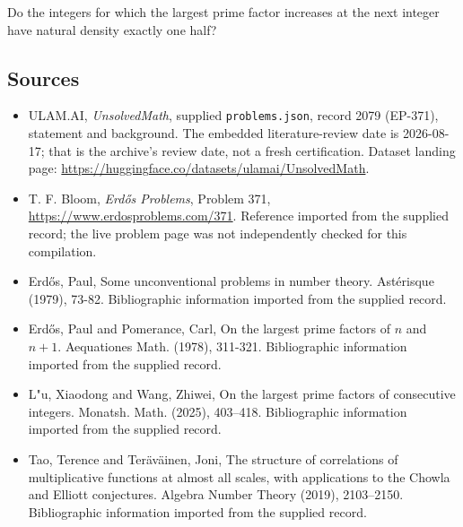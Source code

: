 \documentclass[11pt,a4paper]{article}
\begin{document}
Do the integers for which the largest prime factor increases at the next integer have natural density exactly one half?

\subsection{Sources}

{\small

\begin{itemize}

\item[\hypertarget{source:2079:1}{S1}] ULAM.AI, \emph{UnsolvedMath}, supplied \texttt{problems.json}, record 2079 (EP-371), statement and background. The embedded literature-review date is 2026-08-17; that is the archive’s review date, not a fresh certification. Dataset landing page: \url{https://huggingface.co/datasets/ulamai/UnsolvedMath}.

\item[\hypertarget{source:2079:2}{S2}] T. F. Bloom, \emph{Erdős Problems}, Problem 371, \url{https://www.erdosproblems.com/371}. Reference imported from the supplied record; the live problem page was not independently checked for this compilation.

\item[\hypertarget{source:2079:3}{S3}] Erd\H{o}s, Paul, Some unconventional problems in number theory. Ast\'{e}risque (1979), 73-82. Bibliographic information imported from the supplied record.

\item[\hypertarget{source:2079:4}{S4}] Erd\H{o}s, Paul and Pomerance, Carl, On the largest prime factors of {$n$} and {$n+1$}. Aequationes Math. (1978), 311-321. Bibliographic information imported from the supplied record.

\item[\hypertarget{source:2079:5}{S5}] L"u, Xiaodong and Wang, Zhiwei, On the largest prime factors of consecutive integers. Monatsh. Math. (2025), 403--418. Bibliographic information imported from the supplied record.

\item[\hypertarget{source:2079:6}{S6}] Tao, Terence and Ter\"{a}v\"{a}inen, Joni, The structure of correlations of multiplicative functions at almost all scales, with applications to the {C}howla and {E}lliott conjectures. Algebra Number Theory (2019), 2103--2150. Bibliographic information imported from the supplied record.

\end{itemize}

}

\label{end:2079}
\end{document}
